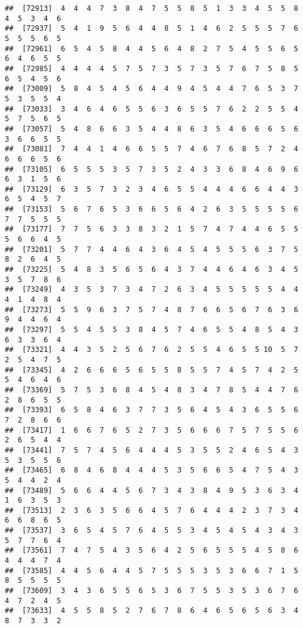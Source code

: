 \documentclass[
]{book}
\begin{document}
\begin{verbatim}
##  [72913]  4  4  4  7  3  8  4  7  5  5  8  5  1  3  3  4  5  5  8  4  5  3  4  6
##  [72937]  5  4  1  9  5  6  4  4  8  5  1  4  6  2  5  5  5  7  6  5  5  5  6  5
##  [72961]  6  5  4  5  8  4  4  5  6  4  8  2  7  5  4  5  5  6  5  6  4  6  5  5
##  [72985]  4  4  4  4  5  7  5  7  3  5  7  3  5  7  6  7  5  8  5  6  5  4  5  6
##  [73009]  5  8  4  5  4  5  6  4  4  9  4  5  4  4  7  6  5  3  7  5  3  5  5  4
##  [73033]  3  4  6  4  6  5  5  6  3  6  5  5  7  6  2  2  5  5  4  5  7  5  6  5
##  [73057]  5  4  8  6  6  3  5  4  4  8  6  3  5  4  6  6  6  5  6  3  6  6  5  5
##  [73081]  7  4  4  1  4  6  6  5  5  7  4  6  7  6  8  5  7  2  4  6  6  6  5  6
##  [73105]  6  5  5  5  3  5  7  3  5  2  4  3  3  6  8  4  6  9  6  6  3  1  5  6
##  [73129]  6  3  5  7  3  2  3  4  6  5  5  4  4  4  6  6  4  4  3  6  5  4  5  7
##  [73153]  5  6  7  6  5  3  6  6  5  6  4  2  6  3  5  5  5  5  6  7  7  5  5  5
##  [73177]  7  7  5  6  3  3  8  3  2  1  5  7  4  7  4  4  6  5  5  5  6  6  4  5
##  [73201]  5  7  7  4  4  6  4  3  6  4  5  4  5  5  5  6  3  7  5  8  2  6  4  5
##  [73225]  5  4  8  3  5  6  5  6  4  3  7  4  4  6  4  6  3  4  5  3  5  7  8  6
##  [73249]  4  3  5  3  7  3  4  7  2  6  3  4  5  5  5  5  5  4  4  4  1  4  8  4
##  [73273]  5  5  9  6  3  7  5  7  4  8  7  6  6  5  6  7  6  3  6  9  4  4  6  4
##  [73297]  5  5  4  5  5  3  8  4  5  7  4  6  5  5  4  8  5  4  3  6  3  3  6  4
##  [73321]  4  4  3  5  2  5  6  7  6  2  5  5  4  6  5  5 10  5  7  2  5  4  7  5
##  [73345]  4  2  6  6  6  5  6  5  5  8  5  5  7  4  5  7  4  2  5  5  4  6  4  6
##  [73369]  5  7  5  3  6  8  4  5  4  8  3  4  7  8  5  4  4  7  6  2  8  6  5  5
##  [73393]  6  5  8  4  6  3  7  7  3  5  6  4  5  4  3  6  5  5  6  7  2  8  6  6
##  [73417]  1  6  6  7  6  5  2  7  3  5  6  6  6  7  5  7  5  5  6  2  6  5  4  4
##  [73441]  7  5  7  4  5  6  4  4  4  5  3  5  5  2  4  6  5  4  3  5  3  5  5  6
##  [73465]  6  8  4  6  8  4  4  4  5  3  5  6  6  5  4  7  5  4  3  5  4  4  2  4
##  [73489]  5  6  6  4  4  5  6  7  3  4  3  8  4  9  5  3  6  3  4  1  6  3  5  3
##  [73513]  2  3  6  3  5  6  6  4  5  7  6  4  4  4  2  3  7  3  4  6  6  8  6  5
##  [73537]  3  6  5  4  5  7  6  4  5  5  3  4  5  4  5  4  3  4  3  5  7  7  6  4
##  [73561]  7  4  7  5  4  3  5  6  4  2  5  6  5  5  5  4  5  8  6  4  4  4  7  4
##  [73585]  4  4  5  6  4  4  5  7  5  5  5  3  5  3  6  6  7  1  5  8  5  5  5  5
##  [73609]  3  4  3  6  5  5  6  5  3  6  7  5  5  3  5  3  6  7  6  4  7  2  4  5
##  [73633]  4  5  5  8  5  2  7  6  7  8  6  4  6  5  6  5  6  3  4  8  7  3  3  2

\end{verbatim}
\end{document}
